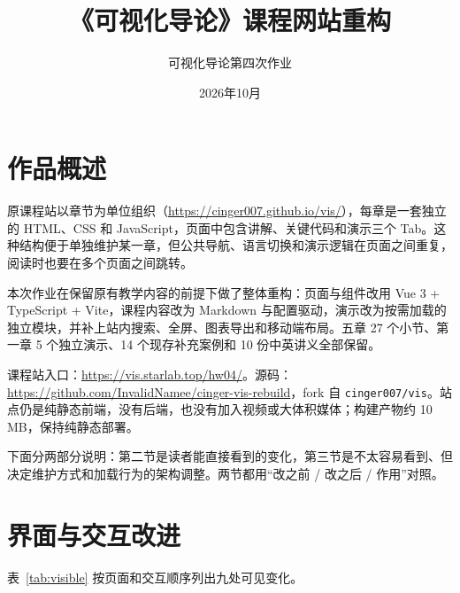 \documentclass[UTF8,a4paper,11pt,fontset=fandol]{ctexart}
\title{《可视化导论》课程网站重构}
\author{可视化导论第四次作业}
\date{2026年10月}
\begin{document}
\maketitle

\section{作品概述}

原课程站以章节为单位组织（\url{https://cinger007.github.io/vis/}），每章是一套独立的 HTML、CSS 和 JavaScript，页面中包含讲解、关键代码和演示三个 Tab。这种结构便于单独维护某一章，但公共导航、语言切换和演示逻辑在页面之间重复，阅读时也要在多个页面之间跳转。

本次作业在保留原有教学内容的前提下做了整体重构：页面与组件改用 Vue 3 + TypeScript + Vite，课程内容改为 Markdown 与配置驱动，演示改为按需加载的独立模块，并补上站内搜索、全屏、图表导出和移动端布局。五章 27 个小节、第一章 5 个独立演示、14 个现存补充案例和 10 份中英讲义全部保留。

课程站入口：\url{https://vis.starlab.top/hw04/}。源码：\url{https://github.com/InvalidNamee/cinger-vis-rebuild}，fork 自 \texttt{cinger007/vis}。站点仍是纯静态前端，没有后端，也没有加入视频或大体积媒体；构建产物约 10\,MB，保持纯静态部署。

下面分两部分说明：第二节是读者能直接看到的变化，第三节是不太容易看到、但决定维护方式和加载行为的架构调整。两节都用“改之前 / 改之后 / 作用”对照。

\section{界面与交互改进}

表~\ref{tab:visible} 按页面和交互顺序列出九处可见变化。
\end{document}
